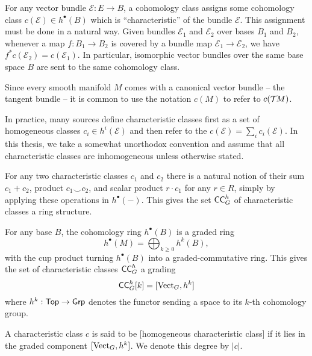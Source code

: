 For any vector bundle $\mathcal{E} : E \to B$, a cohomology class assigns some cohomology class $c(\mathcal{E})\in h^\bullet(B)$ which is ``characteristic'' of the bundle $\mathcal{E}$.
This assignment must be done in a natural way. Given bundles $\mathcal{E}_1$ and $\mathcal{E}_2$ over bases $B_1$ and $B_2$, whenever a map $f : B_1 \to B_2$ is covered by a bundle map $\mathcal{E}_1 \to \mathcal{E}_2$, we have $f^* c(\mathcal{E}_2) = c(\mathcal{E}_1)$. In particular, isomorphic vector bundles over the same base space $B$ are sent to the same cohomology class.

\begin{convention*}
	Since every smooth manifold $M$ comes with a canonical vector bundle -- the tangent bundle -- it is common to use the notation $c(M)$ to refer to $c({\mathcal{T}\hspace{-0.1em}} M)$.
\end{convention*}

\begin{remark}
	In practice, many sources define characteristic classes first as a set of homogeneous classes $c_i\in h^i(\mathcal{E})$ and then refer to the  $c(\mathcal{E})=\sum_i c_i(\mathcal{E})$. In this thesis, we take a somewhat unorthodox convention and assume that all characteristic classes are inhomogeneous unless otherwise stated.
\end{remark}

For any two characteristic classes $c_1$ and $c_2$ there is a natural notion of their sum $c_1+c_2$, product $c_1\smile c_2$, and scalar product $r\cdot c_1$ for any $r\in R$, simply by applying these operations in $h^\bullet(-)$. This gives the set $\mathsf{CC}_G^h$ of characteristic classes a ring structure.

For any base $B$, the cohomology ring $h^\bullet(B)$ is a graded ring
\[
	h^\bullet(M) = \bigoplus_{k\geq 0} h^k(B),
\]
with the cup product turning $h^\bullet(B)$ into a graded-commutative ring.
This gives the set of characteristic classes $\mathsf{CC}_G^h$ a grading
\[
	\mathsf{CC}_G^h[k] = [\operatorname{Vect}_G, h^k]
\]
where $h^k: \mathsf{Top} \to \mathsf{Grp}$ denotes the functor sending a space to its $k$-th cohomology group.

\begin{definition}
	A characteristic class $c$ is said to be [homogeneous characteristic class] if it lies in the graded component $[\operatorname{Vect}_G, h^k]$. We denote this degree by $|c|$.
\end{definition}

